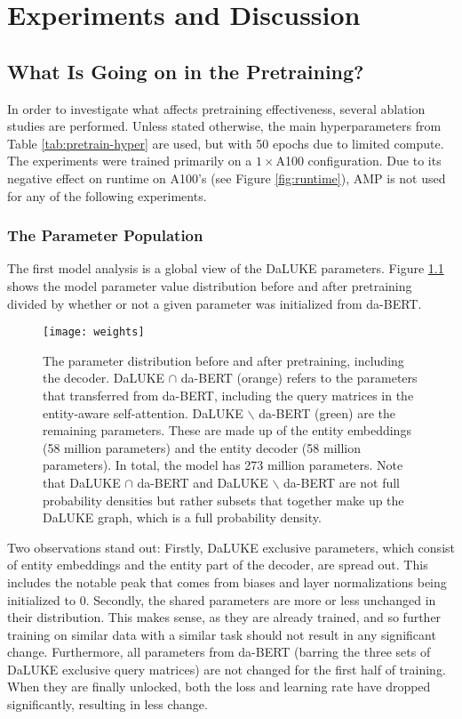 \documentclass[main.tex]{subfiles}
\begin{document}
\chapter{Experiments and Discussion}
\label{chap:discussion}

\section{What Is Going on in the Pretraining?}
\label{sec:pretrainpls}
In order to investigate what affects pretraining effectiveness, several ablation studies are performed.
Unless stated otherwise, the main hyperparameters from Table \ref{tab:pretrain-hyper} are used, but with 50 epochs due to limited compute.
The experiments were trained primarily on a $ 1\times$A100 configuration.
Due to its negative effect on runtime on A100's (see Figure \ref{fig:runtime}), AMP is not used for any of the following experiments.
\subsection{The Parameter Population}
The first model analysis is a global view of the DaLUKE parameters.
Figure \ref{fig:weight-dist} shows the model parameter value distribution before and after pretraining divided by whether or not a given parameter was initialized from da-BERT.
\begin{figure}[H]
    \centering
    \texttt{[image: weights]}
    \caption{
        The parameter distribution before and after pretraining, including the decoder.
        DaLUKE $ \cap $ da-BERT (orange) refers to the parameters that transferred from da-BERT, including the query matrices in the entity-aware self-attention.
        DaLUKE $ \backslash $ da-BERT (green) are the remaining parameters.
        These are made up of the entity embeddings (58 million parameters) and the entity decoder (58 million parameters).
        In total, the model has 273 million parameters.
        Note that DaLUKE $ \cap $ da-BERT and DaLUKE $ \backslash $ da-BERT are not full probability densities but rather subsets that together make up the DaLUKE graph, which is a full probability density.
    }
    \label{fig:weight-dist}
\end{figure}\noindent
Two observations stand out:
Firstly, DaLUKE exclusive parameters, which consist of entity embeddings and the entity part of the decoder, are spread out.
This includes the notable peak that comes from biases and layer normalizations being initialized to 0.
Secondly, the shared parameters are more or less unchanged in their distribution.
This makes sense, as they are already trained, and so further training on similar data with a similar task should not result in any significant change.
Furthermore, all parameters from da-BERT (barring the three sets of DaLUKE exclusive query matrices) are not changed for the first half of training.
When they are finally unlocked, both the loss and learning rate have dropped significantly, resulting in less change.
\end{document}

